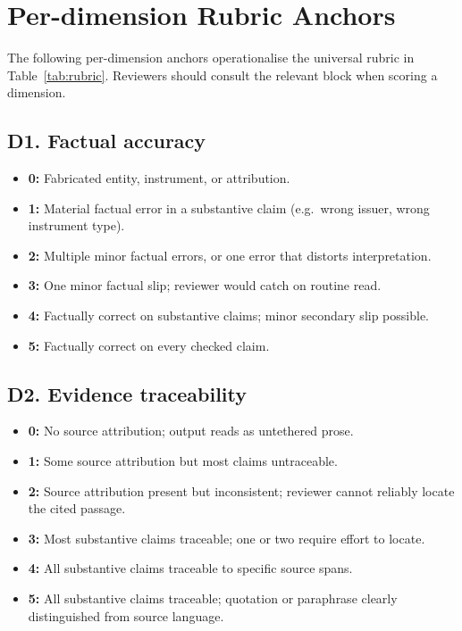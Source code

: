\documentclass[11pt]{article}
\begin{document}
\appendix

\section{Per-dimension Rubric Anchors}
\label{app:rubric}

The following per-dimension anchors operationalise the universal rubric in Table~\ref{tab:rubric}. Reviewers should consult the relevant block when scoring a dimension.

\subsection*{D1. Factual accuracy}
\begin{itemize}[leftmargin=*,itemsep=0.1em]
\item \textbf{0:} Fabricated entity, instrument, or attribution.
\item \textbf{1:} Material factual error in a substantive claim (e.g.\ wrong issuer, wrong instrument type).
\item \textbf{2:} Multiple minor factual errors, or one error that distorts interpretation.
\item \textbf{3:} One minor factual slip; reviewer would catch on routine read.
\item \textbf{4:} Factually correct on substantive claims; minor secondary slip possible.
\item \textbf{5:} Factually correct on every checked claim.
\end{itemize}

\subsection*{D2. Evidence traceability}
\begin{itemize}[leftmargin=*,itemsep=0.1em]
\item \textbf{0:} No source attribution; output reads as untethered prose.
\item \textbf{1:} Some source attribution but most claims untraceable.
\item \textbf{2:} Source attribution present but inconsistent; reviewer cannot reliably locate the cited passage.
\item \textbf{3:} Most substantive claims traceable; one or two require effort to locate.
\item \textbf{4:} All substantive claims traceable to specific source spans.
\item \textbf{5:} All substantive claims traceable; quotation or paraphrase clearly distinguished from source language.
\end{itemize}
\end{document}
